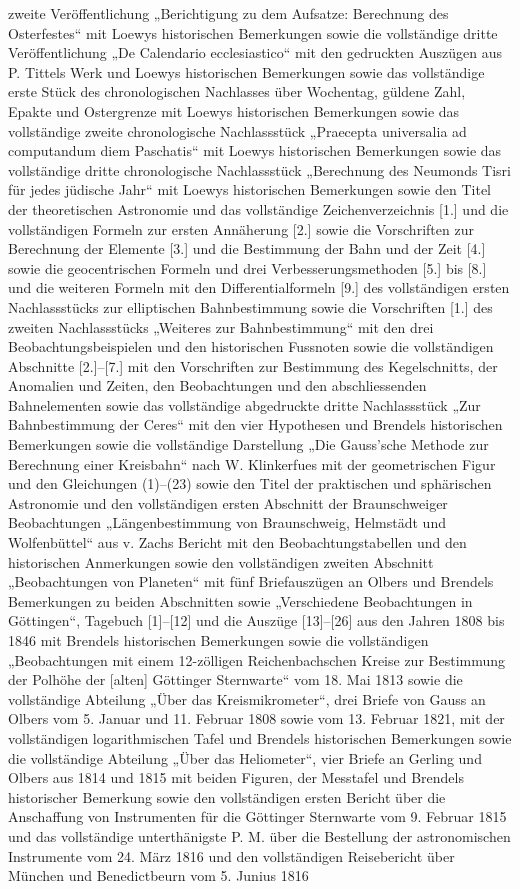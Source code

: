 zweite Veröffentlichung „Berichtigung zu dem Aufsatze: Berechnung des Osterfestes“ mit Loewys historischen Bemerkungen sowie die vollständige dritte Veröffentlichung „De Calendario ecclesiastico“ mit den gedruckten Auszügen aus P. Tittels Werk und Loewys historischen Bemerkungen sowie das vollständige erste Stück des chronologischen Nachlasses über Wochentag, güldene Zahl, Epakte und Ostergrenze mit Loewys historischen Bemerkungen sowie das vollständige zweite chronologische Nachlassstück „Praecepta universalia ad computandum diem Paschatis“ mit Loewys historischen Bemerkungen sowie das vollständige dritte chronologische Nachlassstück „Berechnung des Neumonds Tisri für jedes jüdische Jahr“ mit Loewys historischen Bemerkungen sowie den Titel der theoretischen Astronomie und das vollständige Zeichenverzeichnis [1.] und die vollständigen Formeln zur ersten Annäherung [2.] sowie die Vorschriften zur Berechnung der Elemente [3.] und die Bestimmung der Bahn und der Zeit [4.] sowie die geocentrischen Formeln und drei Verbesserungsmethoden [5.] bis [8.] und die weiteren Formeln mit den Differentialformeln [9.] des vollständigen ersten Nachlassstücks zur elliptischen Bahnbestimmung sowie die Vorschriften [1.] des zweiten Nachlassstücks „Weiteres zur Bahnbestimmung“ mit den drei Beobachtungsbeispielen und den historischen Fussnoten sowie die vollständigen Abschnitte [2.]–[7.] mit den Vorschriften zur Bestimmung des Kegelschnitts, der Anomalien und Zeiten, den Beobachtungen und den abschliessenden Bahnelementen sowie das vollständige abgedruckte dritte Nachlassstück „Zur Bahnbestimmung der Ceres“ mit den vier Hypothesen und Brendels historischen Bemerkungen sowie die vollständige Darstellung „Die Gauss’sche Methode zur Berechnung einer Kreisbahn“ nach W. Klinkerfues mit der geometrischen Figur und den Gleichungen (1)–(23) sowie den Titel der praktischen und sphärischen Astronomie und den vollständigen ersten Abschnitt der Braunschweiger Beobachtungen „Längenbestimmung von Braunschweig, Helmstädt und Wolfenbüttel“ aus v. Zachs Bericht mit den Beobachtungstabellen und den historischen Anmerkungen sowie den vollständigen zweiten Abschnitt „Beobachtungen von Planeten“ mit fünf Briefauszügen an Olbers und Brendels Bemerkungen zu beiden Abschnitten sowie „Verschiedene Beobachtungen in Göttingen“, Tagebuch [1]–[12] und die Auszüge [13]–[26] aus den Jahren 1808 bis 1846 mit Brendels historischen Bemerkungen sowie die vollständigen „Beobachtungen mit einem 12-zölligen Reichenbachschen Kreise zur Bestimmung der Polhöhe der [alten] Göttinger Sternwarte“ vom 18. Mai 1813 sowie die vollständige Abteilung „Über das Kreismikrometer“, drei Briefe von Gauss an Olbers vom 5. Januar und 11. Februar 1808 sowie vom 13. Februar 1821, mit der vollständigen logarithmischen Tafel und Brendels historischen Bemerkungen sowie die vollständige Abteilung „Über das Heliometer“, vier Briefe an Gerling und Olbers aus 1814 und 1815 mit beiden Figuren, der Messtafel und Brendels historischer Bemerkung sowie den vollständigen ersten Bericht über die Anschaffung von Instrumenten für die Göttinger Sternwarte vom 9. Februar 1815 und das vollständige unterthänigste P. M. über die Bestellung der astronomischen Instrumente vom 24. März 1816 und den vollständigen Reisebericht über München und Benedictbeurn vom 5. Junius 1816 